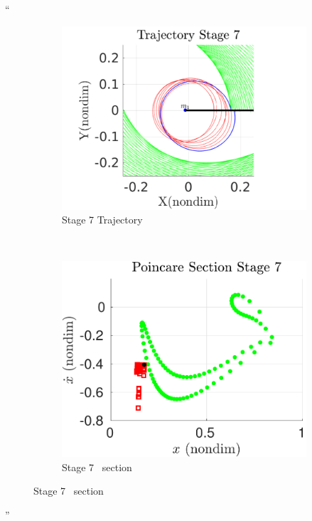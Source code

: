 \documentclass[11pt]{article}
\newenvironment{correction}{\begin{list}{}{\setlength{\leftmargin}{1cm}\setlength{\rightmargin}{1cm}}\vspace{\parsep}\item[]``}{''\end{list}}
\begin{document}
\begin{enumerate}
\begin{correction}
\begin{figure}[H]
    \begin{subfigure}[htbp]{0.2\textwidth} 
        \includegraphics[width=\textwidth, keepaspectratio]{figures/geo_transfer/stage7_trajectory_zoom.pdf} 
        \caption{Stage 7 Trajectory} 
    \end{subfigure}~
    \begin{subfigure}[htbp]{0.2\textwidth} 
        \includegraphics[width=\textwidth, keepaspectratio]{figures/geo_transfer/stage7_poincare.pdf} 
        \caption{Stage 7 \Poincare~section } 
    \end{subfigure}
 

\end{figure}
\end{correction}
\end{enumerate}
\end{document}
